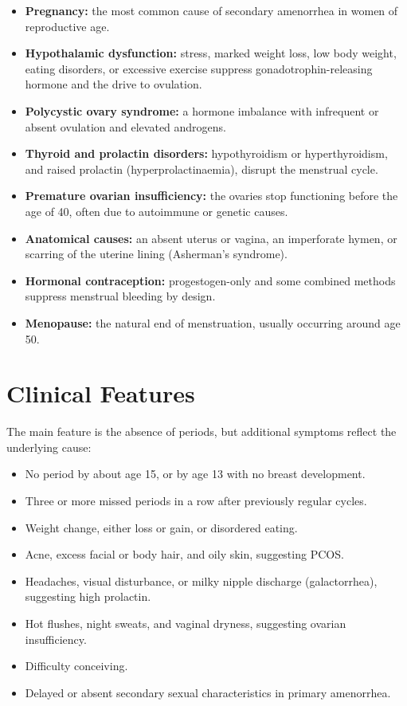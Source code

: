 \begin{itemize}
    \item \textbf{Pregnancy:} the most common cause of secondary amenorrhea in women of reproductive age.
    \item \textbf{Hypothalamic dysfunction:} stress, marked weight loss, low body weight, eating disorders, or excessive exercise suppress gonadotrophin-releasing hormone and the drive to ovulation.
    \item \textbf{Polycystic ovary syndrome:} a hormone imbalance with infrequent or absent ovulation and elevated androgens.
    \item \textbf{Thyroid and prolactin disorders:} hypothyroidism or hyperthyroidism, and raised prolactin (hyperprolactinaemia), disrupt the menstrual cycle.
    \item \textbf{Premature ovarian insufficiency:} the ovaries stop functioning before the age of 40, often due to autoimmune or genetic causes.
    \item \textbf{Anatomical causes:} an absent uterus or vagina, an imperforate hymen, or scarring of the uterine lining (Asherman's syndrome).
    \item \textbf{Hormonal contraception:} progestogen-only and some combined methods suppress menstrual bleeding by design.
    \item \textbf{Menopause:} the natural end of menstruation, usually occurring around age 50.
\end{itemize}

\section*{Clinical Features}
The main feature is the absence of periods, but additional symptoms reflect the underlying cause:

\begin{itemize}
    \item No period by about age 15, or by age 13 with no breast development.
    \item Three or more missed periods in a row after previously regular cycles.
    \item Weight change, either loss or gain, or disordered eating.
    \item Acne, excess facial or body hair, and oily skin, suggesting PCOS.
    \item Headaches, visual disturbance, or milky nipple discharge (galactorrhea), suggesting high prolactin.
    \item Hot flushes, night sweats, and vaginal dryness, suggesting ovarian insufficiency.
    \item Difficulty conceiving.
    \item Delayed or absent secondary sexual characteristics in primary amenorrhea.
\end{itemize}

